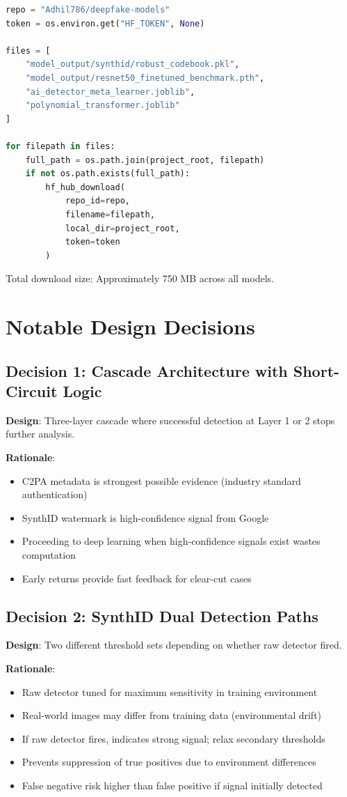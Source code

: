 \documentclass[12pt,a4paper]{book}
\begin{document}
\begin{itemize}
\begin{lstlisting}[language=Python]
repo = "Adhil786/deepfake-models"
token = os.environ.get("HF_TOKEN", None)

files = [
    "model_output/synthid/robust_codebook.pkl",
    "model_output/resnet50_finetuned_benchmark.pth",
    "ai_detector_meta_learner.joblib",
    "polynomial_transformer.joblib"
]

for filepath in files:
    full_path = os.path.join(project_root, filepath)
    if not os.path.exists(full_path):
        hf_hub_download(
            repo_id=repo,
            filename=filepath,
            local_dir=project_root,
            token=token
        )
\end{lstlisting}

Total download size: Approximately 750 MB across all models.

\section{Notable Design Decisions}

\subsection{Decision 1: Cascade Architecture with Short-Circuit Logic}

\textbf{Design}: Three-layer cascade where successful detection at Layer 1 or 2 stops further analysis.

\textbf{Rationale}:
\begin{itemize}
    \item C2PA metadata is strongest possible evidence (industry standard authentication)
    \item SynthID watermark is high-confidence signal from Google
    \item Proceeding to deep learning when high-confidence signals exist wastes computation
    \item Early returns provide fast feedback for clear-cut cases
\end{itemize}

\subsection{Decision 2: SynthID Dual Detection Paths}

\textbf{Design}: Two different threshold sets depending on whether raw detector fired.

\textbf{Rationale}:
\begin{itemize}
    \item Raw detector tuned for maximum sensitivity in training environment
    \item Real-world images may differ from training data (environmental drift)
    \item If raw detector fires, indicates strong signal; relax secondary thresholds
    \item Prevents suppression of true positives due to environment differences
    \item False negative risk higher than false positive if signal initially detected
\end{itemize}


\end{itemize}
\end{document}
